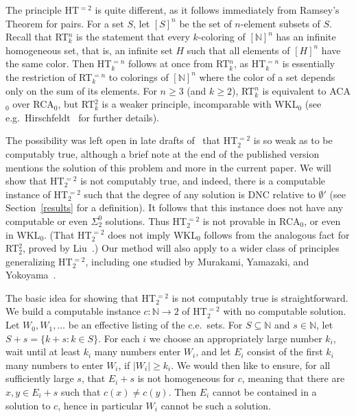 \documentclass{amsart}
\theoremstyle{definition}
\renewcommand{\geq}{\geqslant}
\begin{document}
The principle HT$^{=2}$ is quite different, as it follows immediately
from Ramsey's Theorem for pairs. For a set $S$, let $[S]^n$ be the set
of $n$-element subsets of $S$. Recall that RT$^n_k$ is the statement
that every $k$-coloring of $[\mathbb N]^n$ has an infinite homogeneous
set, that is, an infinite set $H$ such that all elements of $[H]^n$
have the same color. Then HT$^{=n}_k$ follows at once from RT$^n_k$,
as HT$^{=n}_k$ is essentially the restriction of RT$^{=n}_k$ to
colorings of $[\mathbb N]^n$ where the color of a set depends only on
the sum of its elements. For $n \geq 3$ (and $k \geq 2$), RT$^n_k$ is
equivalent to ACA$_0$ over RCA$_0$, but RT$^2_k$ is a weaker
principle, incomparable with WKL$_0$ (see
e.g.\ Hirschfeldt~\cite{Hbook} for further details).

The possibility was left open in late drafts of~\cite{DJSW} that
HT$^{=2}_2$ is so weak as to be computably true, although a brief note
at the end of the published version mentions the solution of this
problem and more in the current paper. We will show that HT$^{=2}_2$
is not computably true, and indeed, there is a computable instance of
HT$^{=2}_2$ such that the degree of any solution is DNC relative to
$\emptyset'$ (see Section~\ref{results} for a definition). It follows
that this instance does not have any computable or even $\Sigma^0_2$
solutions. Thus HT$^{=2}_2$ is not provable in RCA$_0$, or even in
WKL$_0$. (That HT$^{=2}_2$ does not imply WKL$_0$ follows from the
analogous fact for RT$^2_2$, proved by Liu~\cite{Liu}.) Our method
will also apply to a wider class of principles generalizing
HT$^{=2}_2$, including one studied by Murakami, Yamazaki, and
Yokoyama~\cite{MYY}.

The basic idea for showing that HT$^{=2}_2$ is not computably true is
straightforward. We build a computable instance $c : \mathbb N
\rightarrow 2$ of HT$^{=2}_2$ with no computable solution. Let
$W_0,W_1,\ldots$ be an effective listing of the c.e.\ sets. For $S
\subseteq \mathbb N$ and $s \in \mathbb N$, let $S + s = \{k + s : k
\in S\}$. For each $i$ we choose an appropriately large number $k_i$,
wait until at least $k_i$ many numbers enter $W_i$, and let $E_i$
consist of the first $k_i$ many numbers to enter $W_i$, if $|W_i| \geq
k_i$. We would then like to ensure, for all sufficiently large $s$,
that $E_i + s$ is not homogeneous for $c$, meaning that there are $x,y
\in E_i + s$ such that $c(x) \neq c(y)$. Then $E_i$ cannot be
contained in a solution to $c$, hence in particular $W_i$ cannot be
such a solution.
\end{document}
